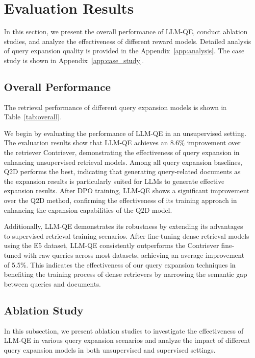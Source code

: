 
\section{Evaluation Results}

In this section, we present the overall performance of LLM-QE, conduct ablation studies, and analyze the effectiveness of different reward models. Detailed analysis of query expansion quality is provided in the Appendix~\ref{app:analysis}. The case study is shown in Appendix~\ref{app:case_study}.


\subsection{Overall Performance}
The retrieval performance of different query expansion models is shown in Table~\ref{tab:overall}.

We begin by evaluating the performance of LLM-QE in an unsupervised setting. The evaluation results show that LLM-QE achieves an 8.6\% improvement over the retriever Contriever, demonstrating the effectiveness of query expansion in enhancing unsupervised retrieval models. Among all query expansion baselines, Q2D performs the best, indicating that generating query-related documents as the expansion results is particularly suited for LLMs to generate effective expansion results. After DPO training, LLM-QE shows a significant improvement over the Q2D method, confirming the effectiveness of its training approach in enhancing the expansion capabilities of the Q2D model.

Additionally, LLM-QE demonstrates its robustness by extending its advantages to supervised retrieval training scenarios. After fine-tuning dense retrieval models using the E5 dataset, LLM-QE consistently outperforms the Contriever fine-tuned with raw queries across most datasets, achieving an average improvement of 5.5\%. This indicates the effectiveness of our query expansion techniques in benefiting the training process of dense retrievers by narrowing the semantic gap between queries and documents.



\subsection{Ablation Study}\label{sec:ablation}
In this subsection, we present ablation studies to investigate the effectiveness of LLM-QE in various query expansion scenarios and analyze the impact of different query expansion models in both unsupervised and supervised settings.

